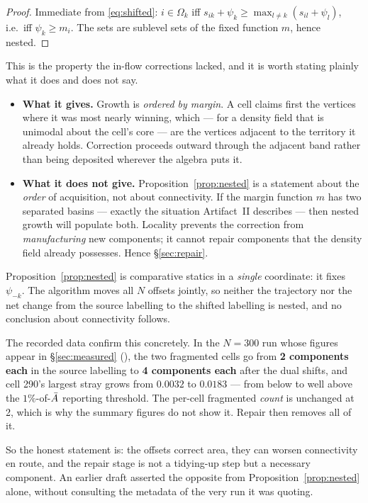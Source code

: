 \documentclass[11pt,a4paper]{article}
\begin{document}
\begin{proof}
Immediate from \eqref{eq:shifted}: $i \in \Omega_k$ iff
$s_{ik} + \psi_k \ge \max_{l\neq k}(s_{il} + \psi_l)$, i.e.\ iff $\psi_k \ge m_i$.
The sets are sublevel sets of the fixed function $m$, hence nested.
\end{proof}

This is the property the in-flow corrections lacked, and it is worth stating
plainly what it does and does not say.

\begin{itemize}\itemsep3pt
  \item \textbf{What it gives.} Growth is \emph{ordered by margin}. A cell claims
    first the vertices where it was most nearly winning, which --- for a density
    field that is unimodal about the cell's core --- are the vertices adjacent to
    the territory it already holds. Correction proceeds outward through the
    adjacent band rather than being deposited wherever the algebra puts it.
  \item \textbf{What it does not give.} Proposition~\ref{prop:nested} is a
    statement about the \emph{order} of acquisition, not about connectivity.
    If the margin function $m$ has two separated basins --- exactly the situation
    Artifact~II describes --- then nested growth will populate both. Locality
    prevents the correction from \emph{manufacturing} new components; it cannot
    repair components that the density field already possesses. Hence
    \S\ref{sec:repair}.
\end{itemize}

\begin{remark}
\label{rem:shifts-fragment}
Proposition~\ref{prop:nested} is comparative statics in a \emph{single} coordinate:
it fixes $\psi_{-k}$. The algorithm moves all $N$ offsets jointly, so neither the
trajectory nor the net change from the source labelling to the shifted labelling is
nested, and no conclusion about connectivity follows.

The recorded data confirm this concretely. In the $N=300$ run whose figures appear
in \S\ref{sec:measured} (), the two fragmented cells go
from \textbf{2 components each} in the source labelling to \textbf{4 components
each} after the dual shifts, and cell 290's largest stray grows from $0.0032$ to
$0.0183$ --- from below to well above the $1\%$-of-$\bar{A}$ reporting threshold.
The per-cell fragmented \emph{count} is unchanged at 2, which is why the summary
figures do not show it. Repair then removes all of it.

So the honest statement is: the offsets correct area, they can worsen connectivity
en route, and the repair stage is not a tidying-up step but a necessary component.
An earlier draft asserted the opposite from Proposition~\ref{prop:nested} alone,
without consulting the metadata of the very run it was quoting.
\end{remark}
\end{document}
